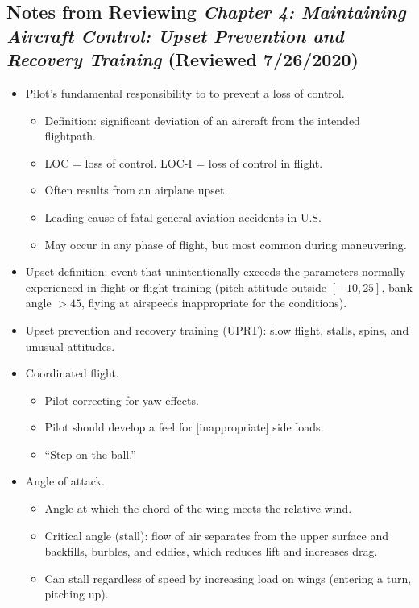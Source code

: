 \documentclass[letterpaper,10pt,titlepage]{article}
\begin{document}
\subsection{Notes from Reviewing \emph{Chapter 4:  Maintaining Aircraft Control:
            Upset Prevention and Recovery Training}
            (Reviewed 7/26/2020)}
\label{snra0:supr0}

\begin{itemize}
\item Pilot's fundamental responsibility to to prevent a loss of control.
	  \begin{itemize}
	  \item Definition:  significant deviation of an aircraft from the intended flightpath.
	  \item LOC = loss of control.  LOC-I = loss of control in flight.
	  \item Often results from an airplane upset.
	  \item Leading cause of fatal general aviation accidents in U.S.
	  \item May occur in any phase of flight, but most common during maneuvering.
	  \end{itemize}
\item Upset definition:  event that unintentionally exceeds the parameters normally
      experienced in flight or flight training (pitch attitude outside $[-10, 25]$, bank
	  angle $>45$, flying at airspeeds inappropriate for the conditions).
\item Upset prevention and recovery training (UPRT):  slow flight, stalls, spins, and unusual attitudes.
\item Coordinated flight.
	  \begin{itemize}
	  \item Pilot correcting for yaw effects.
	  \item Pilot should develop a feel for [inappropriate] side loads.
	  \item ``Step on the ball.''
	  \end{itemize}
\item Angle of attack.
	  \begin{itemize}
	  \item Angle at which the chord of the wing meets the relative wind.
	  \item Critical angle (stall):  flow of air separates from the upper surface and backfills, burbles, and eddies,
	        which reduces lift and increases drag.
	  \item Can stall regardless of speed by increasing load on wings (entering a turn, pitching up).

\end{itemize}
\end{itemize}
\end{document}
